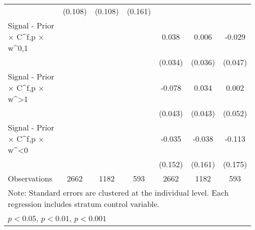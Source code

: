 {\begin{tabular}{l*{6}{c}}
                    &     (0.108)         &     (0.108)         &     (0.161)         &                     &                     &                     \\
Signal - Prior $\times$ C^{f,p} $\times$ w^{0,1}&                     &                     &                     &       0.038         &       0.006         &      -0.029         \\
                    &                     &                     &                     &     (0.034)         &     (0.036)         &     (0.047)         \\
Signal - Prior $\times$ C^{f,p} $\times$ w^{>1}&                     &                     &                     &      -0.078         &       0.034         &       0.002         \\
                    &                     &                     &                     &     (0.043)         &     (0.043)         &     (0.052)         \\
Signal - Prior $\times$ C^{f,p} $\times$ w^{<0}&                     &                     &                     &      -0.035         &      -0.038         &      -0.113         \\
                    &                     &                     &                     &     (0.152)         &     (0.161)         &     (0.175)         \\
\hline
Observations        &        2662         &        1182         &         593         &        2662         &        1182         &         593         \\
\hline\hline
\multicolumn{7}{l}{\footnotesize Note: Standard errors are clustered at the individual level. Each regression includes stratum control variable.}\\
\multicolumn{7}{l}{\footnotesize \sym{*} \(p<0.05\), \sym{**} \(p<0.01\), \sym{***} \(p<0.001\)}\\
\end{tabular}
}
